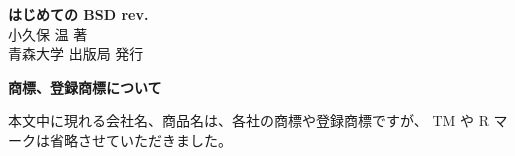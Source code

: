 \begin{titlepage}
\vspace*{7cm}
\begin{center}
\textbf{\Huge はじめての BSD rev.}\\
\vspace*{1cm}
\textnormal{\Large 小久保 温 著}\\
\vspace*{7mm}
\textnormal{\large 青森大学 出版局 発行}
\end{center}
\end{titlepage}
\thispagestyle{empty}
\vspace*{21cm}
\noindent
\textbf{商標、登録商標について}

本文中に現れる会社名、商品名は、各社の商標や登録商標ですが、
TM や R マークは省略させていただきました。
